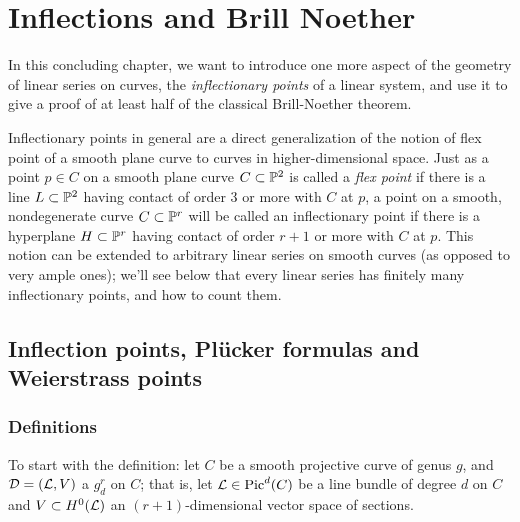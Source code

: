 

\chapter{Inflections and Brill Noether}
\label{InflectionsChapter}

In this concluding chapter, we want to introduce one more aspect of the geometry of linear series on curves, the \emph{inflectionary points} of a linear system, and use it to give a proof of at least half of the classical Brill-Noether theorem.

Inflectionary points in general are a direct generalization of the notion of flex point of a smooth plane curve to curves in higher-dimensional space. Just as a point $p \in C$ on a smooth plane curve $C \subset \PP^2$ is called a \emph{flex point} if there is a line $L \subset \PP^2$ having contact of order 3 or more with $C$ at $p$, a point on a smooth, nondegenerate curve $C \subset \PP^r$ will be called an inflectionary point if there is a hyperplane $H \subset \PP^r$ having contact of order $r+1$ or more with $C$ at $p$. This notion can be extended to arbitrary linear series on smooth curves (as opposed to very ample ones); we'll see below that every linear series has finitely many inflectionary points, and how to count them.


\section{Inflection points,  Pl\"ucker formulas and Weierstrass points}

\subsection{Definitions}

To start with the definition: let $C$ be a smooth projective curve of genus $g$, and $\cD = (\cL,V)$ a $g^r_d$ on $C$; that is, let $\cL \in \Pic^d(C)$ be a line bundle of degree $d$ on $C$ and $V \subset H^0(\cL)$ an $(r+1)$-dimensional vector space of sections.

